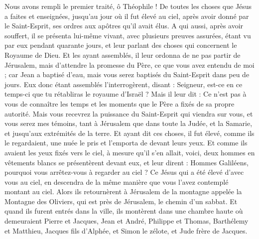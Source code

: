 \begin{multicols}{2}
\VerseOne{}Nous avons rempli le premier traité, ô Théophile ! De toutes les choses que Jésus a faites et enseignées,
jusqu'au jour où il fut élevé au ciel, après avoir donné par le Saint-Esprit, ses ordres aux apôtres qu'il avait élus.
A qui aussi, après avoir souffert, il se présenta lui-même vivant, avec plusieurs preuves assurées, étant vu par eux pendant quarante jours, et leur parlant des choses qui concernent le Royaume de Dieu.
Et les ayant assemblés, il leur ordonna de ne pas partir de Jérusalem, mais d’attendre la promesse du Père, ce que vous avez entendu de moi ;
car Jean a baptisé d'eau, mais vous serez baptisés du Saint-Esprit dans peu de jours.
Eux donc étant assemblés l'interrogèrent, disant : Seigneur, est-ce en ce temps-ci que tu rétabliras le royaume d'Israël ?
Mais il leur dit : Ce n'est pas à vous de connaître les temps et les moments que le Père a fixés de sa propre autorité.
Mais vous recevrez la puissance du Saint-Esprit qui viendra sur vous, et vous serez mes témoins, tant à Jérusalem que dans toute la Judée, et la Samarie, et jusqu'aux extrémités de la terre.
Et ayant dit ces choses, il fut élevé, comme ils le regardaient, une nuée le pris et l'emporta de devant leurs yeux.
Et comme ils avaient les yeux fixés vers le ciel, à mesure qu'il s'en allait, voici, deux hommes en vêtements blancs se présentèrent devant eux,
et leur dirent : Hommes Galiléens, pourquoi vous arrêtez-vous à regarder au ciel ? Ce Jésus qui a été élevé d'avec vous au ciel, en descendra de la même manière que vous l’avez contemplé montant au ciel.
Alors ils retournèrent à Jérusalem de la montagne appelée la Montagne des Oliviers, qui est près de Jérusalem, le chemin d'un sabbat.
Et quand ils furent entrés dans la ville, ils montèrent dans une chambre haute où demeuraient Pierre et Jacques, Jean et André, Philippe et Thomas, Barthélemy et Matthieu, Jacques fils d'Alphée, et Simon le zélote, et Jude frère de Jacques.

\end{multicols}
